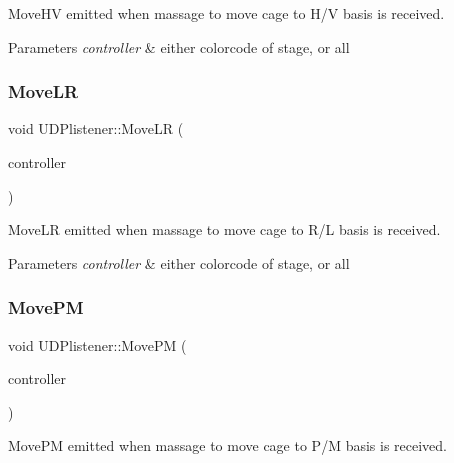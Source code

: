 Move\+HV emitted when massage to move cage to H/V basis is received. 


\begin{DoxyParams}{Parameters}
{\em controller} & either colorcode of stage, or \textquotesingle{}all\textquotesingle{} \\
\hline
\end{DoxyParams}
\mbox{\label{classUDPlistener_aefb57eacf9148d294952db636eefa9ac}} 
\subsubsection{\texorpdfstring{Move\+LR}{MoveLR}}
{\footnotesize\ttfamily void U\+D\+Plistener\+::\+Move\+LR (\begin{DoxyParamCaption}\item[{Q\+String}]{controller }\end{DoxyParamCaption})\hspace{0.3cm}{\ttfamily [signal]}}



Move\+LR emitted when massage to move cage to R/L basis is received. 


\begin{DoxyParams}{Parameters}
{\em controller} & either colorcode of stage, or \textquotesingle{}all\textquotesingle{} \\
\hline
\end{DoxyParams}
\mbox{\label{classUDPlistener_a3e3521c57796737bb229eeadb2f2fdfe}} 
\subsubsection{\texorpdfstring{Move\+PM}{MovePM}}
{\footnotesize\ttfamily void U\+D\+Plistener\+::\+Move\+PM (\begin{DoxyParamCaption}\item[{Q\+String}]{controller }\end{DoxyParamCaption})\hspace{0.3cm}{\ttfamily [signal]}}



Move\+PM emitted when massage to move cage to P/M basis is received. 


